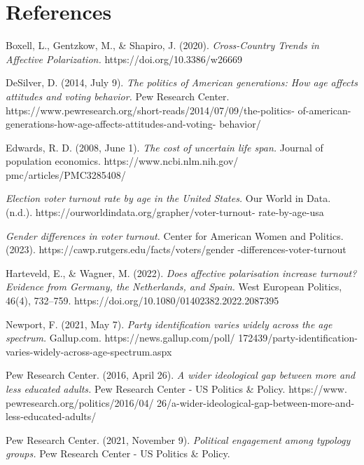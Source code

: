 \documentclass[titlepage, 12pt, leqno]{article} %
\begin{document}
\pagebreak
\section*{References}
\begin{enumerate}[label={[\arabic*]}]
    \item Boxell, L., Gentzkow, M., \& Shapiro, J. (2020). \textit{Cross-Country
        Trends in Affective Polarization.} https://doi.org/10.3386/w26669
    \item DeSilver, D. (2014, July 9). \textit{The politics of American 
        generations: How age affects attitudes and voting behavior.} Pew 
        Research Center. 
        https://www.pewresearch.org/short-reads/2014/07/09/the-politics-
        of-american-generations-how-age-affects-attitudes-and-voting-
        behavior/
    \item Edwards, R. D. (2008, June 1). \textit{The cost of uncertain life 
        span.} Journal of population economics. https://www.ncbi.nlm.nih.gov/
        pmc/articles/PMC3285408/
    \item \textit{Election voter turnout rate by age in the United States.} Our
        World in Data. (n.d.). https://ourworldindata.org/grapher/voter-turnout-
        rate-by-age-usa
    \item \textit{Gender differences in voter turnout.} Center for American 
        Women and Politics. (2023). https://cawp.rutgers.edu/facts/voters/gender
        -differences-voter-turnout
    \item Harteveld, E., \& Wagner, M. (2022). \textit{Does affective 
        polarisation increase turnout? Evidence from Germany, the
        Netherlands, and Spain.} West European Politics, 46(4), 732–759. 
        https://doi.org/10.1080/01402382.2022.2087395
    \item Newport, F. (2021, May 7). \textit{Party identification varies widely
        across the age spectrum.} Gallup.com. https://news.gallup.com/poll/
        172439/party-identification-varies-widely-across-age-spectrum.aspx
    \item Pew Research Center. (2016, April 26). \textit{A wider ideological gap 
        between more and less educated adults.} Pew Research Center - US 
        Politics \& Policy. 
        https://www. pewresearch.org/politics/2016/04/
        26/a-wider-ideological-gap-between-more-and-less-educated-adults/
    \item Pew Research Center. (2021, November 9). \textit{Political engagement 
        among typology groups.} Pew Research Center - US Politics \& Policy.

\end{enumerate}
\end{document}
